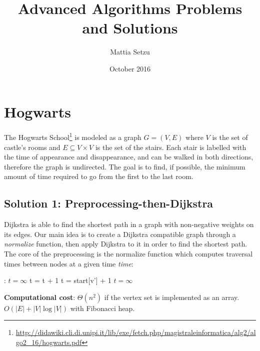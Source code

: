 \documentclass{article}
\title{Advanced Algorithms Problems and Solutions}
\author{Mattia Setzu}
\date{October 2016}
\begin{document}
\maketitle

\tableofcontents
\clearpage

\section{Hogwarts}

The Hogwarts School\footnote{\url{http://didawiki.cli.di.unipi.it/lib/exe/fetch.php/magistraleinformatica/alg2/algo2_16/hogwarts.pdf}}
is modeled as a graph $G=(V, E)$ where $V$ is the set of castle's rooms and $E \subseteq V \times V$
is the set of the stairs.
Each stair is labelled with the time of appearance and disappearance, and can be
walked in both directions, therefore the graph is undirected.
The goal is to find, if possible, the minimum amount of time required to go from
the first to the last room.

\subsection{Solution 1: Preprocessing-then-Dijkstra}

Dijkstra is able to find the shortest path in a graph with non-negative weights
on its edges.
Our main idea is to create a Dijkstra compatible graph through a \emph{normalize}
function, then apply Dijkstra to it in order to find the shortest path.
The core of the preprocessing is the normalize function which computes traversal
times between nodes at a given time \emph{time}:

\begin{algorithmic}[1]
  :
    \State $t = \infty$
    \State {}    
        \State t = t + 1\;
    \State {}              
      \State t = start[v'] + 1\;
    \State \Else
      \State $t = \infty$\;                     
    \EndIf \\
    \EndFunction
\end{algorithmic}

\begin{framed}
  \noindent
  \textbf{Computational cost}: $\Theta(n^{2})$ if the vertex set is implemented
  as an array. $O(|E|+|V|\log |V|)$ with Fibonacci heap.
\end{framed}
\end{document}
